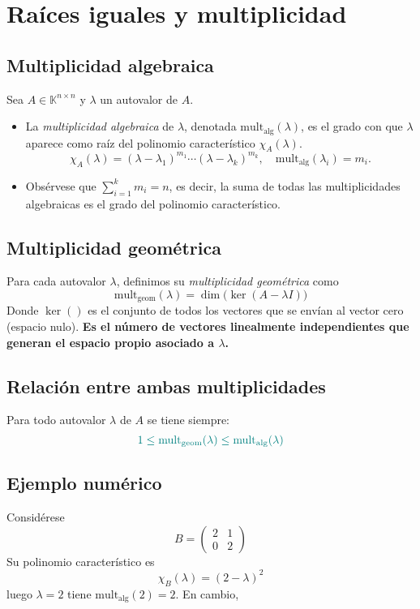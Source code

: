 \documentclass{article}
\begin{document}
\section*{Raíces iguales y multiplicidad}


\subsection*{Multiplicidad algebraica}
Sea \(A\in\mathbb{K}^{n\times n}\) y \(\lambda\) un autovalor de \(A\).  
\begin{itemize}
  \item La \emph{multiplicidad algebraica} de \(\lambda\), denotada \(\mathrm{mult}_{\mathrm{alg}}(\lambda)\), es el grado con que \(\lambda\) aparece como raíz del polinomio característico \(\chi_A(\lambda)\).  
  \[
    \chi_A(\lambda) = (\lambda - \lambda_1)^{m_1}\cdots(\lambda - \lambda_k)^{m_k},
    \quad
    \mathrm{mult}_{\mathrm{alg}}(\lambda_i)=m_i.
  \]

  \item Obsérvese que
  \(\sum_{i=1}^k m_i = n\),
  es decir, la suma de todas las multiplicidades algebraicas es el grado del polinomio característico.
\end{itemize}

\subsection*{Multiplicidad geométrica}
Para cada autovalor \(\lambda\), definimos su \emph{multiplicidad geométrica} como
\[
  \mathrm{mult}_{\mathrm{geom}}(\lambda)
  = \dim\bigl(\ker(A - \lambda I)\bigr)
\]
Donde $\ker()$ es el conjunto de todos los vectores que se envían al vector cero (espacio nulo).
\textbf{\color{teal}Es el número de vectores linealmente independientes que generan el espacio propio asociado a \(\lambda\).}

\subsection*{Relación entre ambas multiplicidades}
Para todo autovalor \(\lambda\) de \(A\) se tiene siempre:
\[\color{teal}
  1 \le \mathrm{mult}_{\mathrm{geom}}(\lambda)
  \le \mathrm{mult}_{\mathrm{alg}}(\lambda)
\]

\subsection*{Ejemplo numérico}
Considérese
\[
  B = \begin{pmatrix}
    2 & 1\\
    0 & 2
  \end{pmatrix}
\]
Su polinomio característico es
\[
  \chi_B(\lambda) = (2-\lambda)^2
\]
luego \(\lambda=2\) tiene \(\mathrm{mult}_{\mathrm{alg}}(2)=2\).  
En cambio,
\end{document}
